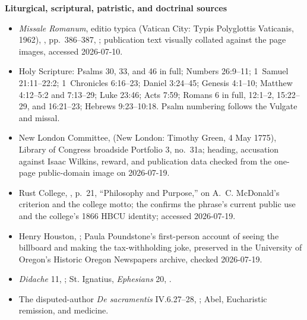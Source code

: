 \textbf{Liturgical, scriptural, patristic, and doctrinal sources}
{\footnotesize
\begin{itemize}[itemsep=0em,topsep=0.15em,parsep=0pt]
\item \emph{Missale Romanum}, editio typica (Vatican City: Typis Polyglottis Vaticanis, 1962), , pp.~386--387, ; publication text visually collated against the page images, accessed 2026-07-10.
\item Holy Scripture: Psalms 30, 33, and 46 in full; Numbers 26:9--11; 1~Samuel 21:11--22:2; 1~Chronicles 6:16--23; Daniel 3:24--45; Genesis 4:1--10; Matthew 4:12--5:2 and 7:13--29; Luke 23:46; Acts 7:59; Romans 6 in full, 12:1--2, 15:22--29, and 16:21--23; Hebrews 9:23--10:18. Psalm numbering follows the Vulgate and missal.
\item New London Committee,  (New London: Timothy Green, 4 May 1775), Library of Congress broadside Portfolio 3, no.~31a; heading, accusation against Isaac Wilkins, reward, and publication data checked from the one-page public-domain image on 2026-07-19.
\item Rust College, , p.~21, ``Philosophy and Purpose,'' on A.~C. McDonald's criterion and the college motto; the  confirms the phrase's current public use and the college's 1866 HBCU identity; accessed 2026-07-19.
\item Henry Houston, ; Paula Poundstone's first-person account of seeing the billboard and making the tax-withholding joke, preserved in the University of Oregon's Historic Oregon Newspapers archive, checked 2026-07-19.
\item \emph{Didache} 11, ; St. Ignatius, \emph{Ephesians} 20, .
\item The disputed-author \emph{De sacramentis} IV.6.27--28, ; Abel, Eucharistic remission, and medicine.

\end{itemize}}
